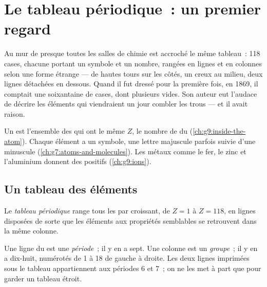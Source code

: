 \chapter{Le tableau périodique~: un premier regard}\label{ch:g9:periodic-table-first-look}

Au mur de presque toutes les salles de chimie est accroché le même
tableau~: 118 cases, chacune portant un symbole et un nombre, rangées en
lignes et en colonnes selon une forme étrange --- de hautes tours sur les
côtés, un creux au milieu, deux lignes détachées en dessous. Quand il fut
dressé pour la première fois, en 1869, il comptait une soixantaine de
cases, dont plusieurs vides. Son auteur eut l'audace de décrire les
éléments qui viendraient un jour combler les trous --- et il avait
raison.

\begin{recall}
Un  est l'ensemble des  qui ont le même  $Z$, le nombre de  du 
(\cref{ch:g9:inside-the-atom}). Chaque élément a un symbole, une lettre
majuscule parfois suivie d'une minuscule
(\cref{ch:g7:atoms-and-molecules}). Les métaux comme le fer, le zinc et
l'aluminium donnent des  positifs (\cref{ch:g9:ions}).
\end{recall}

\section{Un tableau des éléments}

\begin{definition}\label{def:g9:periodic-table-first-look:periodic-table}
Le \emph{tableau périodique} range tous les
 par  croissant, de $Z = 1$ à
$Z = 118$, en lignes disposées de sorte que les éléments aux propriétés
semblables se retrouvent dans la même colonne.
\end{definition}

\begin{definition}\label{def:g9:periodic-table-first-look:period}
Une ligne du  est une \emph{période}~; il
y en a sept. Une colonne est un \emph{groupe}~; il y en a
dix-huit, numérotés de 1 à 18 de gauche à droite. Les deux lignes
imprimées sous le tableau appartiennent aux périodes 6 et 7~; on ne les
met à part que pour garder un tableau étroit.
\end{definition}

